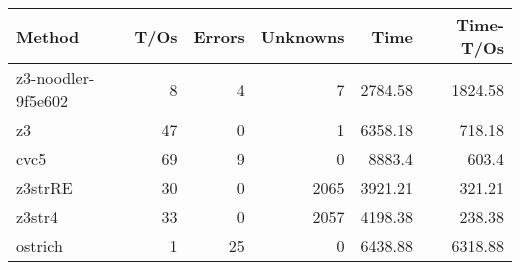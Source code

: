 \begin{tabular}{lrrrrr}
\hline
 Method             &   T/Os &   Errors &   Unknowns &    Time &   Time-T/Os \\
\hline
 z3-noodler-9f5e602 &      8 &        4 &          7 & 2784.58 &     1824.58 \\
 z3                 &     47 &        0 &          1 & 6358.18 &      718.18 \\
 cvc5               &     69 &        9 &          0 & 8883.4  &      603.4  \\
 z3strRE            &     30 &        0 &       2065 & 3921.21 &      321.21 \\
 z3str4             &     33 &        0 &       2057 & 4198.38 &      238.38 \\
 ostrich            &      1 &       25 &          0 & 6438.88 &     6318.88 \\
\hline
\end{tabular}
